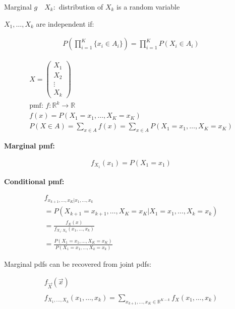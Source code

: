 \documentclass[10pt]{article}
\begin{document}
\newpage

Marginal $g \quad X_k : $ distribution of $X_k$ is a random variable

\hfill 

$X_1, …, X_k$ are independent if: 

\begin{align*}
    P(\prod_{i = 1}^{K}\{x_i \in A_i\}) = \prod_{i = 1}^{K}P(X_i \in A_i)
\end{align*}


\begin{align*}
    X = 
    \begin{pmatrix}
        X_1 \\
        X_2 \\
        \vdots \\
        X_k
    \end{pmatrix} \\ 
    \text{pmf: } f: \mathbb{R}^k \to \mathbb{R} \\ 
    f(x) = P(X_1 = x_1, …, X_K = x_K) \\ 
    P(X \in A) = \sum_{x \in A}f(x) = \sum_{x \in A} P(X_1 = x_1, …, X_K = x_K)
\end{align*}

\textbf{Marginal pmf: }

\begin{align*}
    f_{X_1}(x_1) = P(X_1 = x_1)
\end{align*}

\textbf{Conditional pmf: }

\begin{align*}
    f_{x_{k + 1}, …, x_K | x_1, …, x_k} \\
    = P(X_{k + 1} = x_{k + 1}, …, X_K = x_K | X_1 = x_1, …, X_k = x_k) \\ 
    =\frac{f_X(x)}{f_{X_1 : X_k}(x_1, …, x_k)} \\ 
    \\
    = \frac{P(X_1 = x_1, …, X_K = x_K)}{P(X_1 = x_1, …, X_k = x_k)}
\end{align*}

Marginal pdfs can be recovered from joint pdfs: 

\begin{align*}
    f_{\vec{X}}(\vec{x}) \\ 
    \\
    f_{X_1, …, X_k}(x_1, …, x_k) = \sum_{x_{k + 1}, …, x_K \in \mathbb{R}^{K - k}}f_X(x_1, …, x_k)
\end{align*}

\newpage
\end{document}
